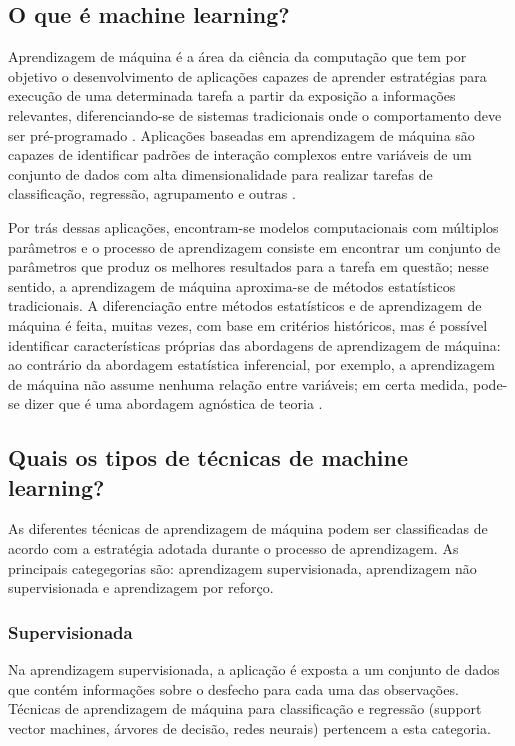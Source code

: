 \subsection{O que é machine learning?}

Aprendizagem de máquina é a área da ciência da computação que tem por objetivo o desenvolvimento
de aplicações capazes de aprender estratégias para execução de uma determinada tarefa a partir da
exposição a informações relevantes, diferenciando-se de sistemas tradicionais onde o comportamento
deve ser pré-programado \cite{Bi2019}. Aplicações baseadas em aprendizagem de máquina são capazes de
identificar padrões de interação complexos entre variáveis de um conjunto de dados com alta dimensionalidade
para realizar tarefas de classificação, regressão, agrupamento e outras \cite{Delgadillo2020}.

Por trás dessas aplicações, encontram-se modelos computacionais com múltiplos parâmetros e o processo de
aprendizagem consiste em encontrar um conjunto de parâmetros que produz os melhores resultados para a tarefa
em questão; nesse sentido, a aprendizagem de máquina aproxima-se de métodos estatísticos tradicionais. A diferenciação
entre métodos estatísticos e de aprendizagem de máquina é feita, muitas vezes, com base em critérios históricos,
mas é possível identificar características próprias das abordagens de aprendizagem de máquina: ao contrário da abordagem
estatística inferencial, por exemplo, a aprendizagem de máquina não assume nenhuma relação entre variáveis; em certa medida,
pode-se dizer que é uma abordagem agnóstica de teoria \cite{Bi2019, Delgadillo2020}.

\subsection{Quais os tipos de técnicas de machine learning?}
As diferentes técnicas de aprendizagem de máquina podem ser classificadas de acordo com a estratégia adotada
durante o processo de aprendizagem. As principais categegorias são: aprendizagem supervisionada, aprendizagem não
supervisionada e aprendizagem por reforço.

\subsubsection{Supervisionada}
Na aprendizagem supervisionada, a aplicação é exposta a um conjunto de dados que contém informações sobre o desfecho
para cada uma das observações. Técnicas de aprendizagem de máquina para classificação e regressão (support vector machines,
árvores de decisão, redes neurais) pertencem a esta categoria.

